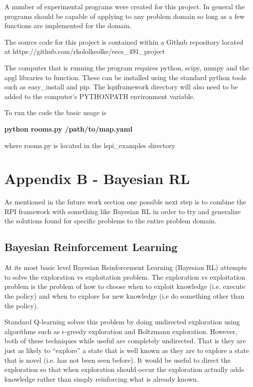 \documentclass[12pt, letterpaper, final]{report}
\begin{document}
A number of experimental programs were created for this project. In
general the programs should be capable of applying to any problem
domain so long as a few functions are implemented for the domain. 

The source code for this project is contained within a Github
repository located at https://github.com/rhololkeolke/eecs\_491\_project

The computer that is running the program requires python, scipy, numpy
and the apgl libraries to function. \cite{numpy_developers_numpy_2012}
\cite{enthought_scipy_2012} These can be installed using the
standard python tools such as easy\_install and pip.  The lspiframework directory will also need to be added to the
computer's PYTHONPATH environment variable.

To run the code the basic usage is 

\vspace{5 mm}
{\bf python rooms.py /path/to/map.yaml}
\vspace{5 mm}

where rooms.py is located in the lspi\_examples directory

\section{Appendix B - Bayesian RL}

As mentioned in the future work section one possible next step is to
combine the RPI framework with something like Bayesian RL in order to
try and generalize the solutions found for specific problems to the
entire problem domain.

\subsection*{Bayesian Reinforcement Learning}

At its most basic level Bayesian Reinforcement Learning (Bayesian RL)
attempts to solve the exploration vs exploitation problem. \cite{dearden_bayesian_1998} The
exploration vs exploitation problem is the problem of how to choose
when to exploit knowledge (i.e. execute the policy) and when to
explore for new knowledge (i.e do something other than the
policy). \cite{wyatt_exploration_1998}

Standard Q-learning solves this problem by doing undirected
exploration using algorithms such as $\epsilon$-greedy exploration and
Boltzmann exploration. \cite{dearden_bayesian_1998} However, both of
these techniques while useful are completely undirected. That is they
are just as likely to ``explore'' a state that is well known as they
are to explore a state that is novel (i.e. has not been seen
before). It would be useful to direct the exploration so that when
exploration should occur the exploration actually adds knowledge
rather than simply reinforcing what is already known.
\end{document}
